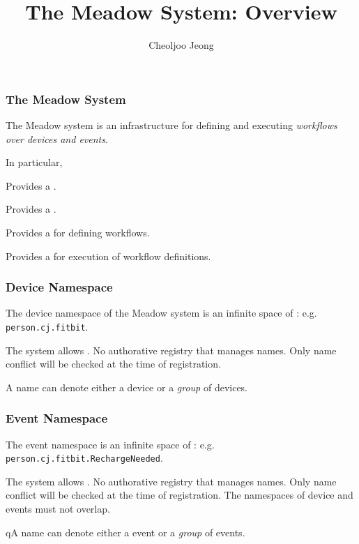 \documentclass{beamer}
\title{The Meadow System: Overview}
\author{Cheoljoo Jeong}
\date{}
\begin{document}
\begin{frame}
\titlepage
\end{frame}


\begin{frame}
\frametitle{The Meadow System}

The Meadow system is an infrastructure for defining and executing
{\em workflows over devices and events\/}. 

\vspace*{0.4cm}

In particular,

\vspace*{0.2cm}

\bit
\w Provides a .

\vspace*{0.2cm}

\w Provides a .

\vspace*{0.2cm}

\w Provides a  for defining workflows.

\vspace*{0.2cm}

\w Provides a  for execution of workflow definitions.
\eit

\end{frame}


\begin{frame}[fragile]
\frametitle{Device Namespace}

The device namespace of the Meadow system is an infinite space of
: e.g.   \verb+person.cj.fitbit+.

\vspace*{0.5cm}

The system allows .
   \bit
   \w No authorative registry that manages names. 
   \w Only name conflict will be checked at the time of registration.
   \eit

\vspace*{0.4cm}

A name can denote either a device or a {\em group\/} of devices.

\end{frame}


\begin{frame}[fragile]
\frametitle{Event Namespace}

The event namespace is an infinite space of : e.g.
\verb+person.cj.fitbit.RechargeNeeded+. 

\vspace*{0.5cm}

The system allows .
   \bit
   \w No authorative registry that manages names. 
   \w Only name conflict will be checked at the time of registration.
   \w The namespaces of device and events must not overlap.
   \eit

\vspace*{0.4cm}

qA name can denote either a event or a {\em group\/} of events.

\end{frame}
\end{document}
